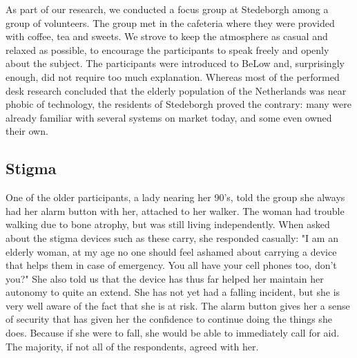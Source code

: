 \documentclass{below-ext}
\begin{document}
As part of our research, we conducted a focus group at Stedeborgh among a group of volunteers. The group met in the cafeteria where they were provided with coffee, tea and sweets. We strove to keep the atmosphere as casual and relaxed as possible, to encourage the participants to speak freely and openly about the subject. The participants were introduced to BeLow and, surprisingly enough, did not require too much explanation. Whereas most of the performed desk research concluded that the elderly population of the Netherlands was near phobic of technology, the residents of Stedeborgh proved the contrary: many were already familiar with several systems on market today, and some even owned their own.

\subsection{Stigma}
 One of the older participants, a lady nearing her 90's, told the group she always had her alarm button with her, attached to her walker. The woman had trouble walking due to bone atrophy, but was still living independently. When asked about the stigma devices such as these carry, she responded casually: "I am an elderly woman, at my age no one should feel ashamed about carrying a device that helps them in case of emergency. You all have your cell phones too, don't you?" She also told us that the device has thus far helped her maintain her autonomy to quite an extend. She has not yet had a falling incident, but she is very well aware of the fact that she is at risk. The alarm button gives her a sense of security that has given her the confidence to continue doing the things she does. Because if she were to fall, she would be able to immediately call for aid. The majority, if not all of the respondents, agreed with her.
\end{document}
